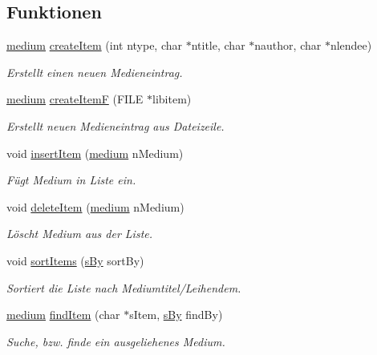 \subsection*{Funktionen}
\begin{DoxyCompactItemize}
\item 
\hyperlink{structmedium}{medium} \hyperlink{group___lend_lib_item_gac92571a026ecb0e77298aa25854e4e7c}{create\+Item} (int ntype, char $\ast$ntitle, char $\ast$nauthor, char $\ast$nlendee)
\begin{DoxyCompactList}\small\item\em Erstellt einen neuen Medieneintrag. \end{DoxyCompactList}\item 
\hyperlink{structmedium}{medium} \hyperlink{group___lend_lib_item_ga131c46edd7b0462d2b46770aeef80e11}{create\+ItemF} (F\+I\+LE $\ast$libitem)
\begin{DoxyCompactList}\small\item\em Erstellt neuen Medieneintrag aus Dateizeile. \end{DoxyCompactList}\item 
void \hyperlink{group___lend_lib_item_gae3168ab8b75f473c77279fa0cde755b1}{insert\+Item} (\hyperlink{structmedium}{medium} n\+Medium)
\begin{DoxyCompactList}\small\item\em Fügt Medium in Liste ein. \end{DoxyCompactList}\item 
void \hyperlink{group___lend_lib_item_ga8579ec2de1ab79c93563ba4d70e9282f}{delete\+Item} (\hyperlink{structmedium}{medium} n\+Medium)
\begin{DoxyCompactList}\small\item\em Löscht Medium aus der Liste. \end{DoxyCompactList}\item 
void \hyperlink{group___lend_lib_item_ga92f15454add90044e9d6a365fae541dc}{sort\+Items} (\hyperlink{group___lend_lib_item_ga557119015745f6890b5eb4367beba8f3}{s\+By} sort\+By)
\begin{DoxyCompactList}\small\item\em Sortiert die Liste nach Mediumtitel/\+Leihendem. \end{DoxyCompactList}\item 
\hyperlink{structmedium}{medium} \hyperlink{group___lend_lib_item_gab0692f28041d0563892f69cd547f387e}{find\+Item} (char $\ast$s\+Item, \hyperlink{group___lend_lib_item_ga557119015745f6890b5eb4367beba8f3}{s\+By} find\+By)
\begin{DoxyCompactList}\small\item\em Suche, bzw. finde ein ausgeliehenes Medium. \end{DoxyCompactList}\end{DoxyCompactItemize}


